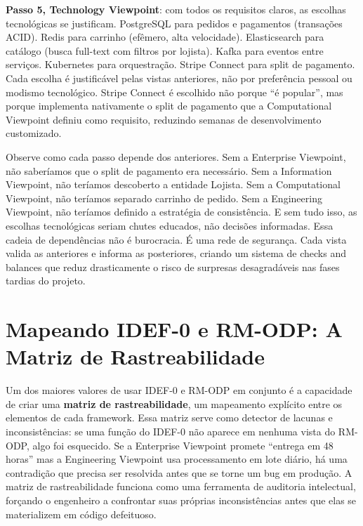 \textbf{Passo 5, Technology Viewpoint}: com todos os requisitos claros, as
escolhas tecnológicas se justificam. PostgreSQL para pedidos e pagamentos
(transações ACID). Redis para carrinho (efêmero, alta velocidade). Elasticsearch
para catálogo (busca full-text com filtros por lojista). Kafka para eventos
entre serviços. Kubernetes para orquestração. Stripe Connect para split de
pagamento. Cada escolha é justificável pelas vistas anteriores, não por
preferência pessoal ou modismo tecnológico. Stripe Connect é escolhido não
porque ``é popular'', mas porque implementa nativamente o split de pagamento
que a Computational Viewpoint definiu como requisito, reduzindo semanas de
desenvolvimento customizado.

Observe como cada passo depende dos anteriores. Sem a Enterprise Viewpoint, não
saberíamos que o split de pagamento era necessário. Sem a Information Viewpoint,
não teríamos descoberto a entidade Lojista. Sem a Computational Viewpoint, não
teríamos separado carrinho de pedido. Sem a Engineering Viewpoint, não teríamos
definido a estratégia de consistência. E sem tudo isso, as escolhas tecnológicas
seriam chutes educados, não decisões informadas. Essa cadeia de dependências não
é burocracia. É uma rede de segurança. Cada vista valida as anteriores e
informa as posteriores, criando um sistema de checks and balances que reduz
drasticamente o risco de surpresas desagradáveis nas fases tardias do projeto.


\section{Mapeando IDEF-0 e RM-ODP: A Matriz de Rastreabilidade}

Um dos maiores valores de usar IDEF-0 e RM-ODP em conjunto é a capacidade de
criar uma \textbf{matriz de rastreabilidade}, um mapeamento explícito entre
os elementos de cada framework. Essa matriz serve como detector de lacunas e
inconsistências: se uma função do IDEF-0 não aparece em nenhuma vista do RM-ODP,
algo foi esquecido. Se a Enterprise Viewpoint promete ``entrega em 48 horas'' mas
a Engineering Viewpoint usa processamento em lote diário, há uma contradição que
precisa ser resolvida antes que se torne um bug em produção. A matriz de
rastreabilidade funciona como uma ferramenta de auditoria intelectual, forçando o engenheiro a confrontar suas próprias inconsistências antes que elas se
materializem em código defeituoso.

